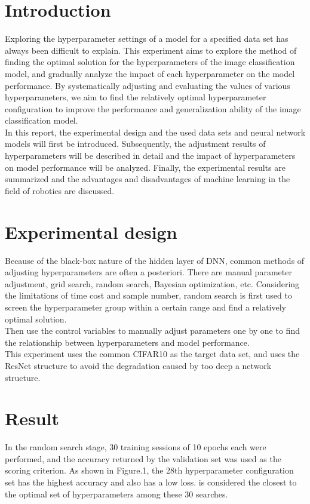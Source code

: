 \documentclass[12pt]{article}
\begin{document}
\section{Introduction}
Exploring the hyperparameter settings of a model for a specified data set has always been difficult to explain. This experiment aims to explore the method of finding the optimal solution for the hyperparameters of the image classification model, and gradually analyze the impact of each hyperparameter on the model performance. By systematically adjusting and evaluating the values of various hyperparameters, we aim to find the relatively optimal hyperparameter configuration to improve the performance and generalization ability of the image classification model.\\

In this report, the experimental design and the used data sets and neural network models will first be introduced. Subsequently, the adjustment results of hyperparameters will be described in detail and the impact of hyperparameters on model performance will be analyzed. Finally, the experimental results are summarized and the advantages and disadvantages of machine learning in the field of robotics are discussed.

\section{Experimental design}
Because of the black-box nature of the hidden layer of DNN, common methods of adjusting hyperparameters are often a posteriori. There are manual parameter adjustment, grid search, random search, Bayesian optimization, etc.
Considering the limitations of time cost and sample number, random search is first used to screen the hyperparameter group within a certain range and find a relatively optimal solution.\\
Then use the control variables to manually adjust parameters one by one to find the relationship between hyperparameters and model performance.\\

This experiment uses the common CIFAR10 as the target data set, and uses the ResNet\cite{ResNet} structure to avoid the degradation caused by too deep a network structure.\\


\section{Result}
In the random search stage, 30 training sessions of 10 epochs each were performed, and the accuracy returned by the validation set was used as the scoring criterion. As shown in Figure.1, the 28th hyperparameter configuration set has the highest accuracy and also has a low loss. is considered the closest to the optimal set of hyperparameters among these 30 searches.
\end{document}
